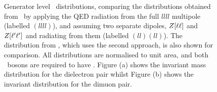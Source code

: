 \begin{figure}
\centering
        \vspace{-5mm}
        \vspace{-2mm}
    \caption[Generator level \mZ\ distributions,
    comparing the distributions obtained from \sherpa\ by applying the QED
    radiation from the full $llll$ multipole, and assuming two
    separate dipoles, $ \Z(\ell\ell) $ and $\Z(\ell'\ell')$ and radiating from
    them.]{ \small Generator level \mZ\ distributions,
    comparing the distributions obtained from \sherpa\ by applying the QED
    radiation from the full $llll$ multipole (labelled $(llll)$), and assuming two
    separate dipoles, $Z[\ell\ell]$ and $Z[\ell'\ell']$ and radiating from
    them (labelled $(ll)(ll)$). The distribution from \powhegbox, which uses the
    second approach, is also shown for comparison. All distributions are
    normalised to unit area, and both \Z\ bosons are required to have \sstooos. Figure (a)
    shows the invariant mass distribution for the dielectron pair whilst Figure 
    (b) shows the invariant distribution for the dimuon pair.
}
    \label{fig:gen-comp-SherpaQED}
\end{figure}


